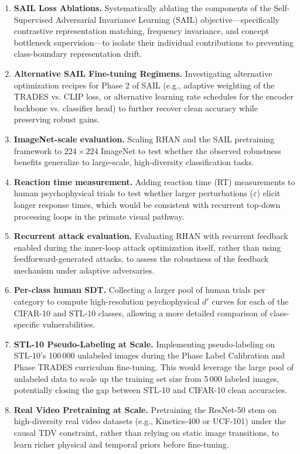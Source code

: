 \documentclass[12pt,a4paper]{article}
\begin{document}
\begin{enumerate}[leftmargin=1.5em]
  \item \textbf{SAIL Loss Ablations.} Systematically ablating the components of the Self-Supervised Adversarial Invariance Learning (SAIL) objective---specifically contrastive representation matching, frequency invariance, and concept bottleneck supervision---to isolate their individual contributions to preventing class-boundary representation drift.
  \item \textbf{Alternative SAIL Fine-tuning Regimens.} Investigating alternative optimization recipes for Phase 2 of SAIL (e.g., adaptive weighting of the TRADES vs. CLIP loss, or alternative learning rate schedules for the encoder backbone vs. classifier head) to further recover clean accuracy while preserving robust gains.
  \item \textbf{ImageNet-scale evaluation.} Scaling RHAN and the SAIL pretraining framework to $224{\times}224$ ImageNet to test whether the observed robustness benefits generalize to large-scale, high-diversity classification tasks.
  \item \textbf{Reaction time measurement.} Adding reaction time (RT) measurements to human psychophysical trials to test whether larger perturbations ($\varepsilon$) elicit longer response times, which would be consistent with recurrent top-down processing loops in the primate visual pathway.
  \item \textbf{Recurrent attack evaluation.} Evaluating RHAN with recurrent feedback enabled during the inner-loop attack optimization itself, rather than using feedforward-generated attacks, to assess the robustness of the feedback mechanism under adaptive adversaries.
  \item \textbf{Per-class human SDT.} Collecting a larger pool of human trials per category to compute high-resolution psychophysical $d'$ curves for each of the CIFAR-10 and STL-10 classes, allowing a more detailed comparison of class-specific vulnerabilities.
  \item \textbf{STL-10 Pseudo-Labeling at Scale.} Implementing pseudo-labeling on STL-10's 100\,000 unlabeled images during the Phase Label Calibration and Phase TRADES curriculum fine-tuning. This would leverage the large pool of unlabeled data to scale up the training set size from 5\,000 labeled images, potentially closing the gap between STL-10 and CIFAR-10 clean accuracies.
  \item \textbf{Real Video Pretraining at Scale.} Pretraining the ResNet-50 stem on high-diversity real video datasets (e.g., Kinetics-400 or UCF-101) under the causal TDV constraint, rather than relying on static image transitions, to learn richer physical and temporal priors before fine-tuning.
\end{enumerate}
\end{document}
